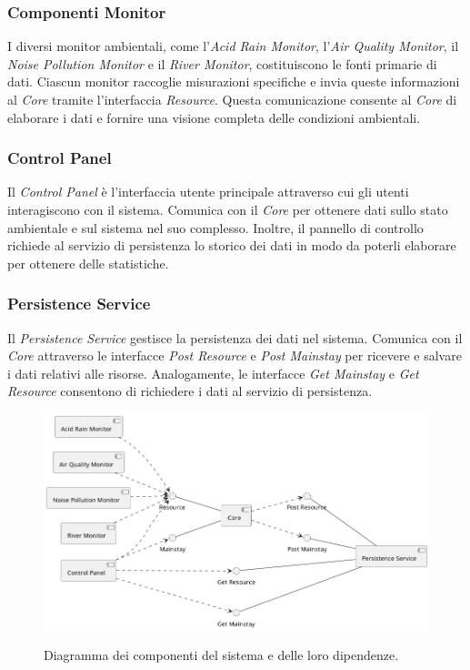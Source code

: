 \documentclass{scrartcl}
\begin{document}
\subsubsection{Componenti Monitor}
I diversi monitor ambientali, come l'\textit{Acid Rain Monitor}, l'\textit{Air Quality Monitor}, il \textit{Noise Pollution Monitor} e il \textit{River Monitor}, costituiscono le fonti primarie di dati. Ciascun monitor raccoglie misurazioni specifiche e invia queste informazioni al \textit{Core} tramite l'interfaccia \textit{Resource}. Questa comunicazione consente al \textit{Core} di elaborare i dati e fornire una visione completa delle condizioni ambientali.

\subsubsection{Control Panel}
Il \textit{Control Panel} è l'interfaccia utente principale attraverso cui gli utenti interagiscono con il sistema. Comunica con il \textit{Core} per ottenere dati sullo stato ambientale e sul sistema nel suo complesso. Inoltre, il pannello di controllo richiede al servizio di persistenza lo storico dei dati in modo da poterli elaborare per ottenere delle statistiche.

\subsubsection{Persistence Service}
Il \textit{Persistence Service} gestisce la persistenza dei dati nel sistema. Comunica con il \textit{Core} attraverso le interfacce \textit{Post Resource} e \textit{Post Mainstay} per ricevere e salvare i dati relativi alle risorse. Analogamente, le interfacce \textit{Get Mainstay} e \textit{Get Resource }consentono di richiedere i dati al servizio di persistenza.

\begin{figure}[h]
    \caption{Diagramma dei componenti del sistema e delle loro dipendenze.}
    \includegraphics[width=\textwidth]{../assets/images/core-component-diagram.png}
    \label{fig:core-component-diagram}
\end{figure}
\end{document}
